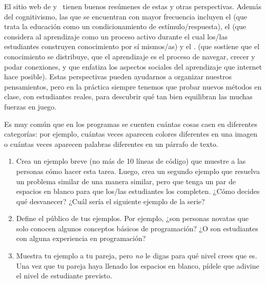 El sitio web de 
y~\cite{Wibu2016}
tienen buenos resúmenes de estas y otras perspectivas.
Además del cognitivismo, las que se encuentran con mayor frecuencia incluyen el 
(que trata la educación como un condicionamiento de estímulo/respuesta),
el 
(que considera al aprendizaje como un proceso activo durante el cual los/las estudiantes construyen conocimiento por sí mismos/as)
y el .
(que sostiene que el conocimiento se distribuye,
que el aprendizaje es el proceso de navegar, crecer y podar conexiones,
y que enfatiza los aspectos sociales del aprendizaje que internet hace posible).
Estas perspectivas pueden ayudarnos a organizar nuestros pensamientos,
pero en la práctica
siempre tenemos que probar nuevos métodos en clase,
con estudiantes reales,
para descubrir qué tan bien equilibran las muchas fuerzas en juego.



Es muy común que en los programas se cuenten cuántas cosas caen en diferentes categorías:
por ejemplo,
cuántas veces aparecen colores diferentes en una imagen
o cuántas veces aparecen palabras diferentes en un párrafo de texto.

\begin{enumerate}
\item
    Crea un ejemplo breve (no más de 10 líneas de código) que muestre a las personas cómo hacer esta tarea.
    Luego, crea un segundo ejemplo que resuelva un problema similar de una manera similar,
    pero que tenga un par de espacios en blanco para que los/las estudiantes los completen.
    ¿Cómo decides qué desvanecer?
    ¿Cuál sería el siguiente ejemplo de la serie?

\item
    Define el público de tus ejemplos.
    Por ejemplo,
    ¿son personas novatas que solo conocen algunos conceptos básicos de programación?
    ¿O son estudiantes con alguna experiencia en programación?

\item
    Muestra tu ejemplo a tu pareja,
    pero \emph{no} le digas para qué nivel crees que es.
    Una vez que tu pareja haya llenado los espacios en blanco,
    pídele que adivine el nivel de estudiante previsto.

\end{enumerate}

